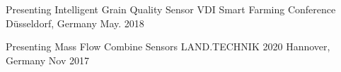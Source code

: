

\begin{cventries}

  \cventry
    {Presenting Intelligent Grain Quality Sensor} %
    {VDI Smart Farming Conference} %
    {Düsseldorf, Germany} %
    {May. 2018} %
    {
      \begin{cvitems} %
      \end{cvitems}
    }

  \cventry
    {Presenting Mass Flow Combine Sensors} %
    {LAND.TECHNIK 2020} %
    {Hannover, Germany} %
    {Nov 2017} %
    {
      \begin{cvitems} %
      \end{cvitems}
    }

\end{cventries}
